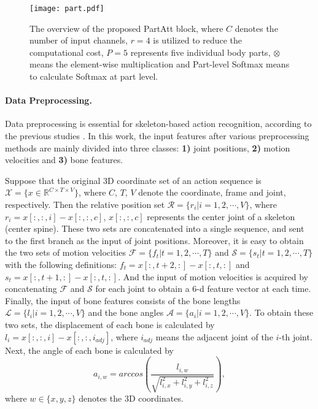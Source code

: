 \documentclass[sigconf]{acmart}
\begin{document}
\begin{figure*}
  \centerline{\texttt{[image: part.pdf]}}
  \vspace{-0.4cm}
  \caption{The overview of the proposed PartAtt block, where $C$ denotes the number of input channels, $r=4$ is utilized to reduce the computational cost, $P=5$ represents five individual body parts, $\otimes$ means the element-wise multiplication and Part-level Softmax means to calculate Softmax at part level. \bv}\label{fig:part}
\end{figure*}

\paragraph{Data Preprocessing.} Data preprocessing is essential for skeleton-based action recognition, according to the previous studies \cite{song2019richly, si2018skeleton, shi2019two}. In this work, the input features after various preprocessing methods are mainly divided into three classes: {\bf 1)} joint positions, {\bf 2)} motion velocities and {\bf 3)} bone features.

Suppose that the original 3D coordinate set of an action sequence is $\mathcal{X}=\{x\in \mathbb{R}^{C\times T\times V}\}$, where $C$, $T$, $V$ denote the coordinate, frame and joint, respectively. Then the relative position set $\mathcal{R}=\{r_{i}|i=1,2,\cdots,V\}$, where $r_{i}=x[:,:,i]-x[:,:,c]$, $x[:,:,c]$ represents the center joint of a skeleton (center spine). These two sets are concatenated into a single sequence, and sent to the first branch as the input of joint positions. Moreover, it is easy to obtain the two sets of motion velocities $\mathcal{F}=\{f_t|t=1,2,\cdots,T\}$ and $\mathcal{S}=\{s_t|t=1,2,\cdots,T\}$ with the following definitions: $f_t=x[:,t+2,:]-x[:,t,:]$ and $s_t=x[:,t+1,:]-x[:,t,:]$. And the input of motion velocities is acquired by concatenating $\mathcal{F}$ and $\mathcal{S}$ for each joint to obtain a 6-d feature vector at each time. Finally, the input of bone features consists of the bone lengths $\mathcal{L}=\{l_i|i=1,2,\cdots,V\}$ and the bone angles $\mathcal{A}=\{a_i|i=1,2,\cdots,V\}$. To obtain these two sets, the displacement of each bone is calculated by $l_i=x[:,:,i]-x[:,:,i_{adj}]$, where $i_{adj}$ means the adjacent joint of the $i$-th joint. Next, the angle of each bone is calculated by
\begin{equation}
a_{i,w}=arccos(\frac{l_{i,w}}{\sqrt{l_{i,x}^2+l_{i,y}^2+l_{i,z}^2}}),
\end{equation}
where $w\in\{x,y,z\}$ denotes the 3D coordinates.
\end{document}
